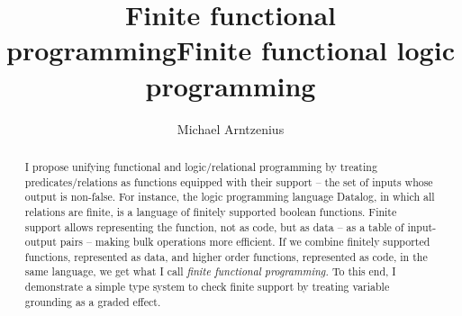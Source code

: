 \documentclass[sigplan, screen, dvipsnames]{acmart}
\title{Finite functional programming}
\title{Finite functional logic programming}
\author{Michael Arntzenius}
\affiliation{%
  \institution{UC Berkeley}
  \city{Berkeley}
  \country{USA}
}
\newcommand\todo[1]{{\color{ACMRed}#1}}
\newcommand\<\;                 %
\begin{document}
\begin{abstract}
  I propose unifying functional and logic/relational programming by treating predicates/relations as functions equipped with their support -- the set of inputs whose output is non-false.
  For instance, the logic programming language Datalog, in which all relations are finite, is a language of finitely supported boolean functions.
  Finite support allows representing the function, not as code, but as data -- as a table of input-output pairs -- making bulk operations more efficient.
%
  If we combine finitely supported functions, represented as data, and higher order functions, represented as code, in the same language, we get what I call \emph{finite functional programming.}
  To this end, I demonstrate a simple type system to check finite support by treating variable grounding as a graded effect.
\end{abstract}

\maketitle







\end{document}
